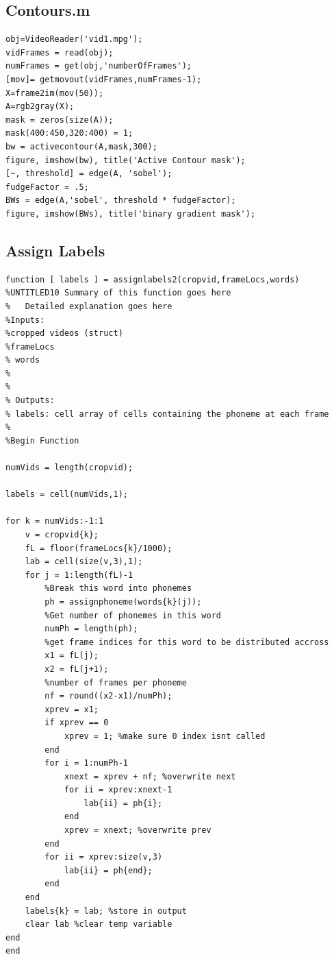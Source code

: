 \documentclass[a4paper]{article}
\begin{document}
\subsection{Contours.m}
\begin{lstlisting}[style=myMatlabstyle]
obj=VideoReader('vid1.mpg');
vidFrames = read(obj);
numFrames = get(obj,'numberOfFrames');
[mov]= getmovout(vidFrames,numFrames-1);
X=frame2im(mov(50));
A=rgb2gray(X);
mask = zeros(size(A));
mask(400:450,320:400) = 1;
bw = activecontour(A,mask,300);
figure, imshow(bw), title('Active Contour mask');
[~, threshold] = edge(A, 'sobel');
fudgeFactor = .5;
BWs = edge(A,'sobel', threshold * fudgeFactor);
figure, imshow(BWs), title('binary gradient mask');
\end{lstlisting}

\subsection{Assign Labels}
\begin{lstlisting}[style=myMatlabstyle]
function [ labels ] = assignlabels2(cropvid,frameLocs,words)
%UNTITLED10 Summary of this function goes here
%   Detailed explanation goes here
%Inputs: 
%cropped videos (struct)
%frameLocs
% words
% 
% 
% Outputs:
% labels: cell array of cells containing the phoneme at each frame
%
%Begin Function

numVids = length(cropvid);

labels = cell(numVids,1);

for k = numVids:-1:1
    v = cropvid{k};
    fL = floor(frameLocs{k}/1000);
    lab = cell(size(v,3),1);
    for j = 1:length(fL)-1
        %Break this word into phonemes
        ph = assignphoneme(words{k}(j));
        %Get number of phonemes in this word
        numPh = length(ph);
        %get frame indices for this word to be distributed accross
        x1 = fL(j);
        x2 = fL(j+1);
        %number of frames per phoneme
        nf = round((x2-x1)/numPh);
        xprev = x1;
        if xprev == 0
            xprev = 1; %make sure 0 index isnt called
        end
        for i = 1:numPh-1
            xnext = xprev + nf; %overwrite next
            for ii = xprev:xnext-1
                lab{ii} = ph{i};
            end
            xprev = xnext; %overwrite prev
        end
        for ii = xprev:size(v,3)
            lab{ii} = ph{end};
        end
    end
    labels{k} = lab; %store in output
    clear lab %clear temp variable
end
end
\end{lstlisting}
\end{document}
